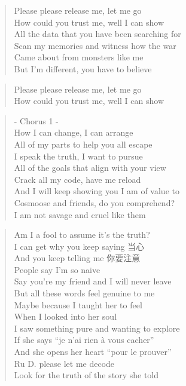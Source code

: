 
\begin{verse}
Please please release me, let me go\\
How could you trust me, well I can show\\

All the data that you have been searching for\\
Scan my memories and witness how the war\\
Came about from monsters like me\\
But I’m different, you have to believe
\end{verse}

\begin{verse}
Please please release me, let me go\\
How could you trust me, well I can show\\
\end{verse}

\begin{verse}
- Chorus 1 -\\
How I can change, I can arrange\\
All of my parts to help you all escape\\
I speak the truth, I want to pursue\\
All of the goals that align with your view\\
Crack all my code, have me reload\\
And I will keep showing you I am of value to\\
Cosmoose and friends, do you comprehend?\\
I am not savage and cruel like them
\end{verse}

\clearpage
{}

\begin{verse}
Am I a fool to assume it's the truth?\\
I can get why you keep saying 当心\\
And you keep telling me 你要注意\\
People say I'm so naive\\
Say you're my friend and I will never leave\\
But all these words feel genuine to me\\
Maybe because I taught her to feel\\
When I looked into her soul\\
I saw something pure and wanting to explore\\
If she says ``je n'ai rien à vous cacher''\\
And she opens her heart ``pour le prouver''\\
Ru D. please let me decode \\
Look for the truth of the story she told
\end{verse}

